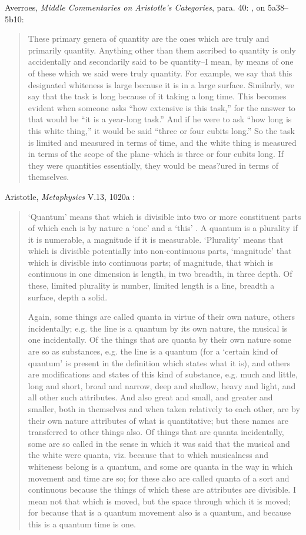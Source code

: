 \documentclass{amsart}
\theoremstyle{definition}
\begin{document}
Averroes, {\em Middle Commentaries on Aristotle's Categories}, para. 40: \cite[p.~47]{butterworth}, on 5a38--5b10:

\begin{quote}
These primary genera of quantity are the ones which are truly and primarily quantity. Anything other than them ascribed to quantity is only
accidentally and secondarily said to be quantity--I mean, by means of one of these which we said were truly quantity. For example, we say that this
designated whiteness is large because it is in a large surface. Similarly, we say that the task is long because of it taking a long time. This becomes
evident when someone asks ``how extensive is this task,'' for the answer to that would be ``it is a year-long task.'' And if he were to ask ``how long is this white thing,'' it would be said ``three or four cubits long.'' So the task is limited and measured in terms of time, and the white thing is measured in terms of the scope of the plane--which is three or four cubits long.
If they were quantities essentially, they would be meas?ured in terms of themselves.
\end{quote}


Aristotle, {\em Metaphysics} V.13, 1020a \cite{metaphysica}:

\begin{quote}
`Quantum' means that which is divisible into two or more constituent parts of which each is by nature a `one'
and a `this' . A quantum is a plurality if it is numerable,
a magnitude if it is measurable. `Plurality' means that which is divisible potentially into non-continuous parts,
`magnitude' that which is divisible into continuous parts; of magnitude, that which is continuous in one dimension is length, in two breadth, in three depth. Of these, limited plurality is number, limited length is a line, breadth a surface, depth a solid.

Again, some things are called quanta in virtue of their
own nature, others incidentally; e.g. the line is a quantum by its own nature, the musical is one incidentally. Of the things that are quanta by their own nature some are so as 
substances, e.g. the line is a quantum (for a `certain kind of quantum' is present in the definition which states what it is), and others are modifications and states of this kind of substance, e.g. much and little, long and short, broad and 
narrow, deep and shallow, heavy and light, and all other such attributes. And also great and small, and greater and smaller, both in themselves and when taken relatively to each other, are by their own nature attributes of what is quantitative; but these names are transferred to other things also. Of things that are quanta incidentally, some are so called in
the sense in which it was said that the musical and the white were quanta, viz. because that to which musicalness and whiteness belong is a quantum, and some are quanta in the way in which movement and time are so; for these also are
called quanta of a sort and continuous because the things of which these are attributes are divisible. I mean not that which is moved, but the space through which it is moved; for because that is a quantum movement also is a quantum, and because this is a quantum time is one.
\end{quote}
\end{document}
